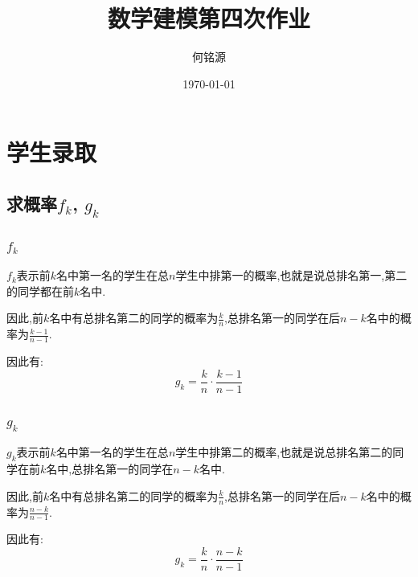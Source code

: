 \documentclass{ctexart}
\author{何铭源}
\date{\today}
\title{数学建模第四次作业}
\begin{document}
\maketitle
\section{学生录取}
\subsection{求概率$f_k$, $g_k$}
\subsubsection{$f_k$}
$f_k$表示前$k$名中第一名的学生在总$n$学生中排第一的概率,也就是说总排名第一,第二的同学都在前$k$名中.

因此,前$k$名中有总排名第二的同学的概率为$\frac{k}{n}$,总排名第一的同学在后$n-k$名中的概率为$\frac{k - 1}{n - 1}$.

因此有:
\begin{equation}
    g_k=\frac{k}{n}\cdot \frac{k - 1}{n - 1}
\end{equation}

\subsubsection{$g_k$}
$g_k$表示前$k$名中第一名的学生在总$n$学生中排第二的概率,也就是说总排名第二的同学在前$k$名中,总排名第一的同学在$n-k$名中.

因此,前$k$名中有总排名第二的同学的概率为$\frac{k}{n}$,总排名第一的同学在后$n-k$名中的概率为$\frac{n-k}{n-1}$.

因此有:
\begin{equation}
    g_k=\frac{k}{n}\cdot \frac{n-k}{n-1}
\end{equation}
\end{document}
